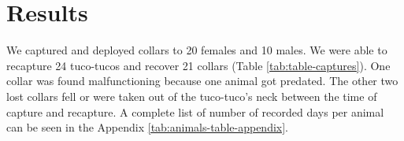 \documentclass[msc,numbers,hidelinks]{coppe}
\begin{document}
  \newpage

  \hypertarget{results}{%
  \section{Results}\label{results}}

  We captured and deployed collars to 20 females and 10 males. We were able to recapture 24 tuco-tucos and recover 21 collars (Table \ref{tab:table-captures}). One collar was found malfunctioning because one animal got predated. The other two lost collars fell or were taken out of the tuco-tuco's neck between the time of capture and recapture. A complete list of number of recorded days per animal can be seen in the Appendix \ref{tab:animals-table-appendix}.
  \begin{table}[h]
  \centering
  \caption{Number of captured animals and sensors deployed in the field. There was a higher number of females captured independent of the season. Recapture rates in February 2021 are lower because field work had to be interrupted due to the covid outbreak. Not all recaptured tucos still had their collars. Some collar were taken out by the animals between the time of captured and recaptured. One tuco was predated and the collar was found 1km away from the initial capture burrow malfunctioning.}
  \label{tab:table-captures}
  \end{table}
\end{document}
